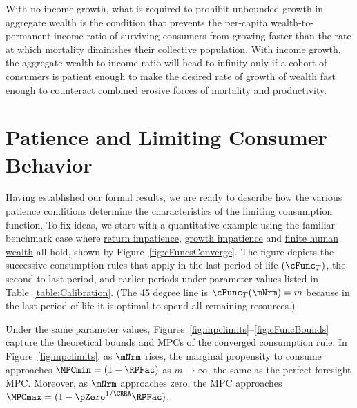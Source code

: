 \documentclass[BufferStockTheory]{subfiles}
\begin{document}
With no income growth, what is required to prohibit unbounded growth in aggregate wealth is the condition that prevents the per-capita wealth-to-permanent-income ratio of surviving consumers from growing faster than the rate at which mortality diminishes their collective population.  With income growth, the aggregate wealth-to-income ratio will head to infinity only if a cohort of consumers is patient enough to make the desired rate of growth of wealth fast enough to counteract combined erosive forces of mortality and productivity.

\hypertarget{Discussion-Growth-Impatience}{}
\section{Patience and Limiting Consumer Behavior}\label{sec:GICdiscussion}

\renewcommand{\figName}{cFuncsConverge} 
 

Having established our formal results, we are ready to describe how the various patience conditions determine the characteristics of the limiting consumption function. To fix ideas, we start with a quantitative example using the familiar benchmark case where \hyperlink{RIC}{return impatience}, \hyperlink{GIC}{growth impatience} and \hyperlink{FHWC}{finite human wealth} all hold, shown by Figure~\ref{fig:cFuncsConverge}. The figure depicts the successive consumption rules that apply in the last period of life $(\cFunc_{T})$, the second-to-last period, and earlier periods under parameter values listed in Table~\ref{table:Calibration}.  (The 45 degree line is $\cFunc_{T}(\mNrm) = m$ because in the last period of life it is optimal to spend all remaining resources.)

Under the same parameter values, Figures~\ref{fig:mpclimits}--\ref{fig:cFuncBounds} capture the theoretical bounds and MPCs of the converged consumption rule.  In Figure~\ref{fig:mpclimits}, as $\mNrm$ rises, the marginal propensity to consume approaches $\MPCmin=(1-\RPFac)$ as $m \rightarrow \infty$, the same as the perfect foresight MPC. Moreover, as $\mNrm$ approaches zero, the MPC approaches $\MPCmax=(1-\pZero^{1/\CRRA}\RPFac)$. 

\renewcommand{\figFile}{mpclimits}
\hypertarget{\figFile}{}

\renewcommand{\figFile}{cFuncBounds}
\hypertarget{\figFile}{}

\end{document}
